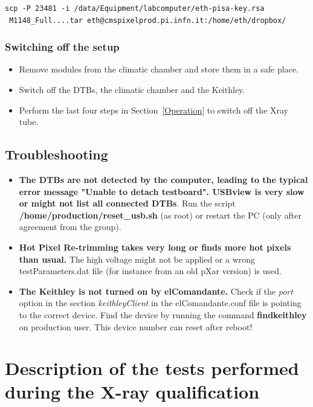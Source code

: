 \documentclass[a4paper,12pt,twoside]{article}
\begin{document}
\begin{Verbatim}[frame=single]
scp -P 23481 -i /data/Equipment/labcomputer/eth-pisa-key.rsa
 M1148_Full....tar eth@cmspixelprod.pi.infn.it:/home/eth/dropbox/
\end{Verbatim}

\subsubsection{Switching off the setup}

\begin{itemize}
\item Remove modules from the climatic chamber and store them in a safe place.
\item Switch off the DTBs, the climatic chamber and the Keithley.
\item Perform the last four steps in Section~\ref{Operation} to switch off the Xray tube.
\end{itemize}

\subsection{Troubleshooting}

\begin{itemize}
\item \textbf{The DTBs are not detected by the computer, leading to the typical error message "Unable to detach testboard". USBview is very slow or might not list all connected DTBs}. Run the script \\ \textbf{/home/production/reset\_usb.sh} (as root) or restart the PC (only after agreement from the group).
\item \textbf{Hot Pixel Re-trimming takes very long or finds more hot pixels than usual.}
The high voltage might not be applied or a wrong testParameters.dat file (for instance from an old pXar version) is used.
\item \textbf{The Keithley is not turned on by elComandante.} Check if the \textit{port} option in the section \textit{keithleyClient} in the elComandante.conf file is pointing to the correct device. Find the device by running the command \mbox{\textbf{findkeithley}} on production user. This device number can reset after reboot!
\end{itemize}
\section{Description of the tests performed during the X-ray qualification}
\end{document}
